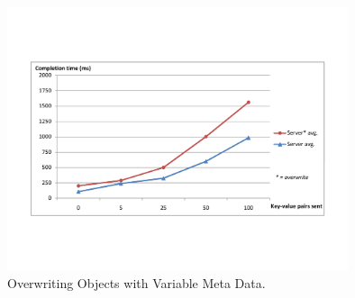 \begin{figure} %
\begin{center}
\includegraphics[trim=5cm 4cm 5cm 5cm,width=10cm]{./figures/ovw_md.pdf}
\caption{Overwriting Objects with Variable Meta Data. \label{ovw-md-size}}
\end{center}
\end{figure}

